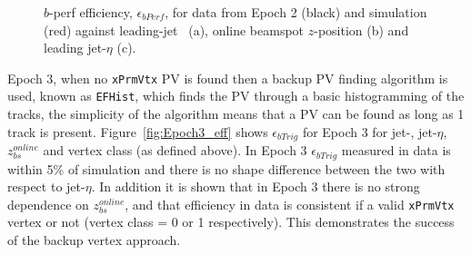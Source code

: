 \begin{figure}[!ht]
\begin{center}
\end{center}
\caption{$b$-perf efficiency, $\epsilon_{bPerf}$, for data from Epoch 2 (black) and simulation (red) against leading-jet \pT~(a), online beamspot $z$-position (b) and leading jet-$\eta$ (c).}
\label{fig:Epoch2_bperf}
\end{figure}
Epoch 3, when no \verb|xPrmVtx| PV is found then a backup PV finding algorithm is used, known as \verb|EFHist|, which finds the PV through a basic histogramming of the tracks,
the simplicity of the algorithm means that a PV can be found as long as 1 track is present.
Figure~\ref{fig:Epoch3_eff} shows $\epsilon_{bTrig}$ for Epoch 3 for jet-\pT, jet-$\eta$,  $z_{bs}^{online}$ and vertex class (as defined above).
In Epoch 3 $\epsilon_{bTrig}$ measured in data is within 5\% of simulation and there is no shape difference between the two with respect to jet-$\eta$.
In addition it is shown that in Epoch 3 there is no strong dependence on  $z_{bs}^{online}$,
and that efficiency in data is consistent if a valid \verb|xPrmVtx| vertex or not (vertex class = 0 or 1 respectively).
This demonstrates the success of the backup vertex approach.

